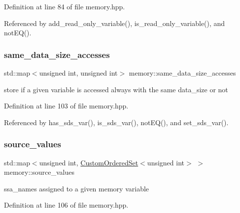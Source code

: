 Definition at line 84 of file memory.\+hpp.



Referenced by add\+\_\+read\+\_\+only\+\_\+variable(), is\+\_\+read\+\_\+only\+\_\+variable(), and not\+E\+Q().

\mbox{\label{classmemory_a8bce4956a8b768487cced20ae90120fc}} 
\subsubsection{\texorpdfstring{same\+\_\+data\+\_\+size\+\_\+accesses}{same\_data\_size\_accesses}}
{\footnotesize\ttfamily std\+::map$<$unsigned int, unsigned int$>$ memory\+::same\+\_\+data\+\_\+size\+\_\+accesses\hspace{0.3cm}{\ttfamily [private]}}



store if a given variable is accessed always with the same data\+\_\+size or not 



Definition at line 103 of file memory.\+hpp.



Referenced by has\+\_\+sds\+\_\+var(), is\+\_\+sds\+\_\+var(), not\+E\+Q(), and set\+\_\+sds\+\_\+var().

\mbox{\label{classmemory_af2c50f29b1e11b8a03c8e58491fc3fb9}} 
\subsubsection{\texorpdfstring{source\+\_\+values}{source\_values}}
{\footnotesize\ttfamily std\+::map$<$unsigned int, \hyperlink{classCustomOrderedSet}{Custom\+Ordered\+Set}$<$unsigned int$>$ $>$ memory\+::source\+\_\+values\hspace{0.3cm}{\ttfamily [private]}}



ssa\+\_\+names assigned to a given memory variable 



Definition at line 106 of file memory.\+hpp.



